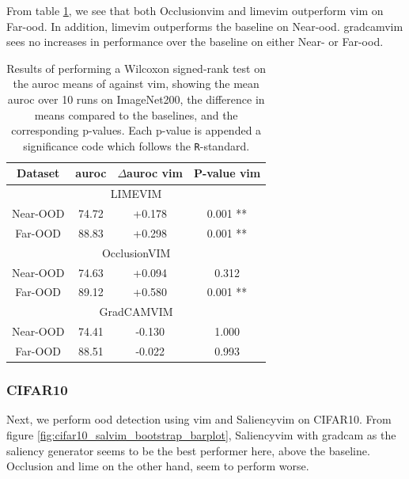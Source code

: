 \documentclass[UKenglish]{uiomasterthesis} %
\theoremstyle{definition}
\begin{document}
From table \ref{table:imagenet200_salvim_ttest}, we see that both Occlusion\ac{vim} and \ac{lime}\ac{vim} outperform \ac{vim} on Far-\ac{ood}. In addition, \ac{lime}\ac{vim} outperforms the baseline on Near-\ac{ood}. \ac{gradcam}\ac{vim} sees no increases in performance over the baseline on either Near- or Far-\ac{ood}.

\begin{table}[H]
\setlength\tabcolsep{3pt}
\begin{center}
\begin{tabular}{ |c|c|c|c| }
    \hline
    Dataset & \ac{auroc} & $\Delta$\ac{auroc} \ac{vim} & P-value \ac{vim} \\
    \hline
    \hline
    \multicolumn{4}{|c|}{LIMEVIM} \\
    \hline
    \rowcolor{near!50}
    Near-OOD & 74.72 & +0.178 & 0.001 ** \\
    \rowcolor{far!50}
    Far-OOD & 88.83 & +0.298 & 0.001 ** \\
    \hline
    \hline
    \multicolumn{4}{|c|}{OcclusionVIM} \\
    \hline
    \rowcolor{near!50}
    Near-OOD & 74.63 & +0.094 & 0.312 \\
    \rowcolor{far!50}
    Far-OOD & 89.12 & +0.580 & 0.001 ** \\
    \hline
    \hline
    \multicolumn{4}{|c|}{GradCAMVIM} \\
    \hline
    \rowcolor{near!50}
    Near-OOD & 74.41 & -0.130 & 1.000 \\
    \rowcolor{far!50}
    Far-OOD & 88.51 & -0.022 & 0.993 \\
    \hline
    \end{tabular}
    \caption[Wilcoxon signed-rank test for SaliencyVIM on ImageNet200]{Results of performing a Wilcoxon signed-rank test on the \ac{auroc} means of against \ac{vim}, showing the mean \ac{auroc} over 10 runs on ImageNet200, the difference in means compared to the baselines, and the corresponding p-values. Each p-value is appended a significance code which follows the \texttt{R}-standard.}
    \label{table:imagenet200_salvim_ttest}
\end{center}
\setlength\tabcolsep{6pt}
\end{table}

\subsubsection{CIFAR10}

Next, we perform \ac{ood} detection using \ac{vim} and Saliency\ac{vim} on CIFAR10. From figure \ref{fig:cifar10_salvim_bootstrap_barplot}, Saliency\ac{vim} with \ac{gradcam} as the saliency generator seems to be the best performer here, above the baseline. Occlusion and \ac{lime} on the other hand, seem to perform worse.
\end{document}
